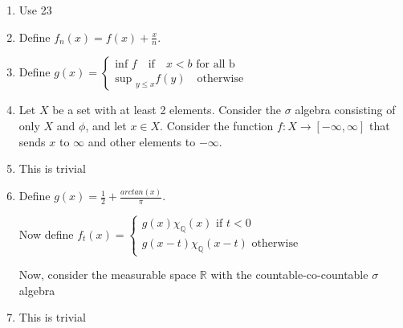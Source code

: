 \documentclass{article}
\begin{document}
\begin{enumerate}
  \item[24]
  Use 23

  \item[25]
  Define $f_n(x)=f(x)+\frac{x}{n}$.

  \item [26]
  Define $g(x)=\begin{cases}
      \text{inf } f \quad \text{if} \quad x < b \text{ for all b} \\
      \text{sup }_{y \leq x} f(y) \quad \text{otherwise}
  \end{cases}$

  \item [27]
  Let $X$ be a set with at least 2 elements. Consider the $\sigma$ algebra consisting of only $X$ and $\phi$, and let $x \in X$. Consider the function $f:X \to[-\infty,\infty]$ that sends $x$ to $\infty$ and other elements to $-\infty$.

  \item [28]
  This is trivial

  \item [29]
  Define $g(x)=\frac{1}{2}+\frac{arctan(x)}{\pi}$.
  
  Now define $f_t(x)=\begin{cases}
      g(x)\chi_{\mathbb{Q}}(x) \text{ if }t<0 \\
      g(x-t)\chi_{\mathbb{Q}}(x-t) \text{ otherwise}
  \end{cases}$

  Now, consider the measurable space $\mathbb{R}$ with the countable-co-countable $\sigma$ algebra

  \item[30]
  This is trivial

\end{enumerate}
\end{document}
